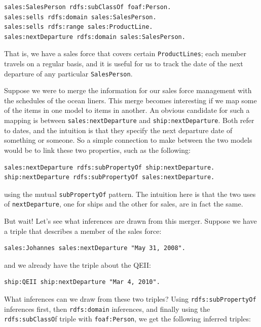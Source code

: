 \begin{lstlisting}
sales:SalesPerson rdfs:subClassOf foaf:Person.
sales:sells rdfs:domain sales:SalesPerson.
sales:sells rdfs:range sales:ProductLine.
sales:nextDeparture rdfs:domain sales:SalesPerson.
\end{lstlisting}

That is, we have a sales force that covers certain \texttt{ProductLines}; each
member travels on a regular basis, and it is useful for us to track the
date of the next departure of any particular \texttt{SalesPerson}.

Suppose we were to merge the information for our sales force management
with the schedules of
the ocean liners. This merge becomes interesting if we map some of the
items in one model to items
in another. An obvious candidate for such a mapping is between
\texttt{sales:nextDeparture} and \texttt{ship:nextDeparture}. Both refer to dates, and the
intuition is that they specify the next departure date of something or
someone. So a simple connection to make between the two models would be
to link these two properties, such as the following:

\begin{lstlisting}
sales:nextDeparture rdfs:subPropertyOf ship:nextDeparture.
ship:nextDeparture rdfs:subPropertyOf sales:nextDeparture.
\end{lstlisting}

using the mutual \texttt{subPropertyOf} pattern. The intuition here is that the
two uses of
\texttt{nextDeparture}, one for ships and the other for sales, are in fact the
same.

But wait! Let's see what inferences are drawn from this merger. Suppose
we have a triple that describes a member of the sales force:

\begin{lstlisting}
sales:Johannes sales:nextDeparture "May 31, 2008".
\end{lstlisting}

and we already have the triple about the QEII:

\begin{lstlisting}
ship:QEII ship:nextDeparture "Mar 4, 2010".
\end{lstlisting}

What inferences can we draw from these two triples? Using
\texttt{rdfs:subPropertyOf} inferences first, then \texttt{rdfs:domain} inferences, and
finally using the \texttt{rdfs:subClassO}f triple with \texttt{foaf:Person}, we get the
following inferred triples:

